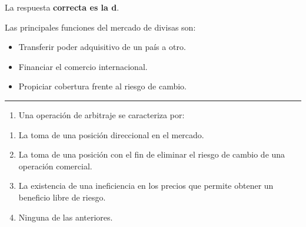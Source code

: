\documentclass[
  letterpaper,
  DIV=11,
  numbers=noendperiod]{scrreprt}
\providecommand{\tightlist}{%
  \setlength{\itemsep}{0pt}\setlength{\parskip}{0pt}}\usepackage{longtable,booktabs,array}
\begin{document}
\begin{tcolorbox}[enhanced jigsaw, left=2mm, opacityback=0, colback=white, breakable, arc=.35mm, bottomrule=.15mm, rightrule=.15mm, toprule=.15mm, leftrule=.75mm, colframe=quarto-callout-tip-color-frame]
\begin{minipage}[t]{5.5mm}
\textcolor{quarto-callout-tip-color}{\faLightbulb}
\end{minipage}%
\begin{minipage}[t]{\textwidth - 5.5mm}

La respuesta \textbf{correcta es la d}.

Las principales funciones del mercado de divisas son:

\begin{itemize}
\item
  Transferir poder adquisitivo de un país a otro.
\item
  Financiar el comercio internacional.
\item
  Propiciar cobertura frente al riesgo de cambio.
\end{itemize}

\end{minipage}%
\end{tcolorbox}

\begin{center}\rule{0.5\linewidth}{0.5pt}\end{center}

\begin{enumerate}
\def\labelenumi{\arabic{enumi}.}
\setcounter{enumi}{4}
\tightlist
\item
  Una operación de arbitraje se caracteriza por:
\end{enumerate}

\begin{enumerate}
\def\labelenumi{\alph{enumi})}
\item
  La toma de una posición direccional en el mercado.
\item
  La toma de una posición con el fin de eliminar el riesgo de cambio de
  una operación comercial.
\item
  La existencia de una ineficiencia en los precios que permite obtener
  un beneficio libre de riesgo.
\item
  Ninguna de las anteriores.
\end{enumerate}
\end{document}
